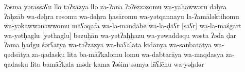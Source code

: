 \clearpage
\begin{transliteration}
    \sloppy
    ʔəsma yərassəʕu llo təʔzāzya
    llo za-ʔana ʔəʔēzzəzomu wa-yaḥawwəru dəḫra ʔaḥzāb wa-dəḫra
    rə\kw{}somu wa-dəḫra ḫasāromu wa-yətqan\-nayu la-ʔamāləktihomu
    wa-yəkawwənəwwomu māʕəqafa wa-la-məndābē wa-la-ḍāʕr [ṣāʕr] wa-la-maśgart
    wa-yətḥaglu [yəthaglu] bəzuḫān wa-yətʔaḫḫazu wa-yəwaddəqu wəsta
    ʔəda ḍar ʔama ḫadgu śərʕātya wa-təʔzāzya wa-baʕālāta
    kidānya wa-sanbatātya wa-qədsātya za-qadasku lita ba-māʔkalomu
    lomu wa-dabtarāya wa-maqdasya za-qadasku lita bamāʔkala
    mədr kama ʔəśim səmya lāʕlēhu wa-yəḫdər

\end{transliteration}
